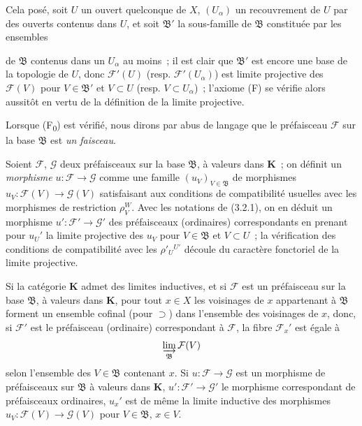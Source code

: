 \begin{env}[3.2.2]
Cela posé, soit $U$ un ouvert quelconque de $X$, $(U_\alpha)$ un recouvrement
de $U$ par des ouverts contenus dans $U$, et soit $\mathfrak{B}'$ la
sous-famille de $\mathfrak{B}$ constituée par les ensembles


de $\mathfrak{B}$ contenus dans un $U_\alpha$ au moins~; il est clair que
$\mathfrak{B}'$ est encore une base de la topologie de $U$, donc
$\mathcal{F}'(U)$ (resp. $\mathcal{F}'(U_\alpha)$) est limite projective des
$\mathcal{F}(V)$ pour $V\in\mathfrak{B}'$ et $V\subset U$ (resp.
$V\subset U_\alpha$)~; l'axiome (F) se vérifie alors aussitôt en vertu de la
définition de la limite projective.

Lorsque (F\textsubscript{0}) est vérifié, nous dirons par abus de langage que
le préfaisceau $\mathcal{F}$ sur la base $\mathfrak{B}$ est \emph{un faisceau}.
\end{env}

\begin{env}[3.2.3]
\label{0.3.2.3-fr}
Soient $\mathcal{F}$, $\mathcal{G}$ deux préfaisceaux sur la base
$\mathfrak{B}$, à valeurs dans $\boldsymbol{K}$~; on définit un \emph{morphisme}
$u:\mathcal{F}\to\mathcal{G}$ comme une famille
$(u_V)_{V\in\mathfrak{B}}$ de morphismes
$u_V:\mathcal{F}(V)\to\mathcal{G}(V)$ satisfaisant aux conditions de
compatibilité usuelles avec les morphismes de restriction $\rho_V^W$. Avec
les notations de (3.2.1), on en déduit un morphisme
$u':\mathcal{F}'\to\mathcal{G}'$ des préfaisceaux (ordinaires) correspondants
en prenant pour $u_U'$ la limite projective des $u_V$ pour
$V\in\mathfrak{B}$ et $V\subset U$~; la vérification des conditions de
compatibilité avec les $\rho'_U{}^{U'}$ découle du caractère fonctoriel de la
limite projective.
\end{env}

\begin{env}[3.2.4]
\label{0.3.2.4-fr}
Si la catégorie $\boldsymbol{K}$ admet des limites inductives, et si $\mathcal{F}$
est un préfaisceau sur la base $\mathfrak{B}$, à valeurs dans $\boldsymbol{K}$,
pour tout $x\in X$ les voisinages de $x$ appartenant à $\mathfrak{B}$ forment
un ensemble cofinal (pour $\supset$) dans l'ensemble des voisinages de $x$,
donc, si $\mathcal{F}'$ est le préfaisceau (ordinaire) correspondant à
$\mathcal{F}$, la fibre $\mathcal{F}_x'$ est égale à
\[
  \varinjlim_{\mathfrak{B}}\mathcal{F}(V)
\]
selon l'ensemble des $V\in\mathfrak{B}$ contenant $x$.
Si $u:\mathcal{F}\to\mathcal{G}$ est un morphisme de préfaisceaux sur
$\mathfrak{B}$ à valeurs dans $\boldsymbol{K}$,
$u':\mathcal{F}'\to\mathcal{G}'$ le morphisme correspondant de préfaisceaux
ordinaires, $u_x'$ est de même la limite inductive des morphismes
$u_V:\mathcal{F}(V)\to\mathcal{G}(V)$ pour $V\in\mathfrak{B}$, $x\in V$.
\end{env}


